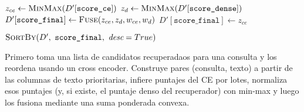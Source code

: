 \begin{algorithmEN}[H]
\begin{algorithmic}[1]
    \State $z_{ce}\gets \Call{MinMax}{D'[\texttt{score\_ce}]}$ 
      \State $z_d\gets \Call{MinMax}{D'[\texttt{score\_dense}]}$ 
      \State $D'[\texttt{score\_final}]\gets \Call{Fuse}{z_{ce},z_d,w_{ce},w_d}$ 
    \Else
      \State $D'[\texttt{score\_final}]\gets z_{ce}$ 
    \EndIf

    \State \Return $\textsc{SortBy}(D',\ \texttt{score\_final},\ \textit{desc}=True)$ 
  \end{algorithmic}
\end{algorithmEN}

Primero toma una lista de candidatos recuperadaos para una consulta y los reordena usando un cross encoder.
Construye pares (consulta, texto) a partir de las columnas de texto prioritarias, infiere puntajes del CE por lotes, normaliza esos puntajes (y, si existe, 
el puntaje denso del recuperador) con min-max y luego los fusiona mediante una suma ponderada convexa.


